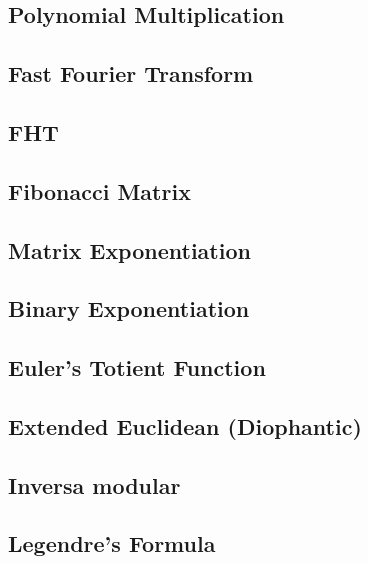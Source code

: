 \subsection{Polynomial Multiplication}
\raggedbottom
\hrulefill
\subsection{Fast Fourier Transform}
\raggedbottom
\hrulefill
\subsection{FHT}
\raggedbottom
\hrulefill
\subsection{Fibonacci Matrix}
\raggedbottom
\hrulefill
\subsection{Matrix Exponentiation}
\raggedbottom
\hrulefill
\subsection{Binary Exponentiation}
\raggedbottom
\hrulefill
\subsection{Euler's Totient Function}
\raggedbottom
\hrulefill
\subsection{Extended Euclidean (Diophantic)}
\raggedbottom
\hrulefill
\subsection{Inversa modular}
\raggedbottom
\hrulefill
\subsection{Legendre's Formula}
\raggedbottom
\hrulefill
